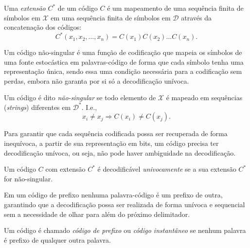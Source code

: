 \begin{definition}
  Uma \emph{extensão} $C^\ast$ de um código $C$ é um mapeamento de uma sequência finita
de símbolos em $\mathcal{X}$ em uma sequência finita de símbolos em $\mathcal{D}$ através da
concatenação dos códigos:
\begin{equation}
C^\ast (x_1,x_2,\ldots,x_n) = C(x_1) C(x_2) \ldots C(x_n) .
\end{equation}
\end{definition}

Um código não-singular é uma função de codificação que mapeia os símbolos de
uma fonte estocástica em palavras-código de forma que cada símbolo tenha uma
representação única, sendo essa uma condição necessária para a codificação sem
perdas, embora não garanta por si só a decodificação unívoca.

\begin{definition}
Um código é dito \emph{não-singular} se todo elemento de $\mathcal{X}$
é mapeado em sequências (\textit{strings}) diferentes em $\mathcal{D}^\ast$. I.e.,
\begin{equation}
x_i \neq x_j \Rightarrow C(x_i) \neq C(x_j) .
\end{equation}
\end{definition}

Para garantir que cada sequência codificada possa ser recuperada de forma inequívoca,
a partir de sua representação em bits, um código precisa ter decodificação unívoca,
ou seja, não pode haver ambiguidade na decodificação.

\begin{definition}
Um código $C$ com extensão $C^\ast$ é decodificável \emph{univocamente} se a sua extensão $C^\ast$ for não-singular.
\end{definition}

Em um código de prefixo nenhuma palavra-código é um prefixo de outra, garantindo que a decodificação possa ser realizada de
forma unívoca e sequencial sem a necessidade de olhar para além do próximo delimitador.

\begin{definition}
Um código é chamado \emph{código de prefixo} ou \emph{código instantâneo} se nenhum palavra
é prefixo de qualquer outra palavra.
\end{definition}

